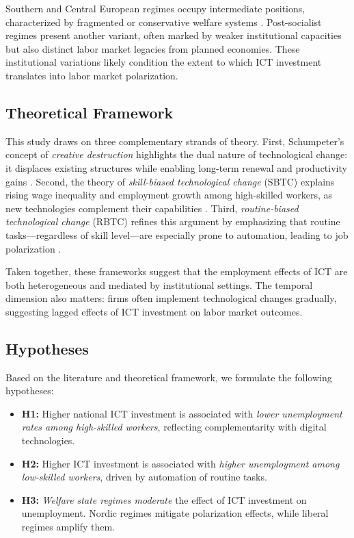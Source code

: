 Southern and Central European regimes occupy intermediate positions, characterized by fragmented or 
conservative welfare systems \parencite{ferrera1996thesouthern}. Post-socialist regimes present 
another variant, often marked by weaker institutional capacities but also distinct labor market 
legacies from planned economies. These institutional variations likely condition the extent to which 
ICT investment translates into labor market polarization.

\subsection{Theoretical Framework}

This study draws on three complementary strands of theory. First, Schumpeter’s concept of 
\textit{creative destruction} highlights the dual nature of technological change: it displaces 
existing structures while enabling long-term renewal and productivity gains 
\parencite{schumpeter1976capitalism}. Second, the theory of 
\textit{skill-biased technological change} (SBTC) explains rising wage inequality and employment 
growth among high-skilled workers, as new technologies complement their capabilities 
\parencite{violante2008skill}. Third, \textit{routine-biased technological change} (RBTC) refines 
this argument by emphasizing that routine tasks—regardless of skill level—are especially prone to 
automation, leading to job polarization \parencite{goos2014explaining}.

Taken together, these frameworks suggest that the employment effects of ICT are both heterogeneous 
and mediated by institutional settings. The temporal dimension also matters: firms often implement 
technological changes gradually, suggesting lagged effects of ICT investment on labor market outcomes.

\subsection{Hypotheses}

Based on the literature and theoretical framework, we formulate the following hypotheses:

\begin{itemize}
    \item \textbf{H1:} Higher national ICT investment is associated with 
    \textit{lower unemployment rates among high-skilled workers}, reflecting complementarity with 
    digital technologies.
    
    \item \textbf{H2:} Higher ICT investment is associated with 
    \textit{higher unemployment among low-skilled workers}, driven by automation of routine tasks.
    
    \item \textbf{H3:} \textit{Welfare state regimes moderate} the effect of ICT investment on 
    unemployment. Nordic regimes mitigate polarization effects, while liberal regimes amplify them.
\end{itemize}
